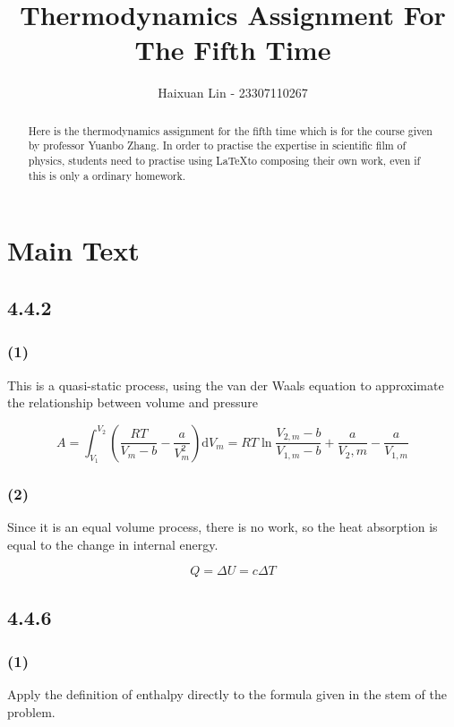 \documentclass[a4paper,11pt]{amsart}
\title{Thermodynamics Assignment For The Fifth Time}
\author{Haixuan Lin - 23307110267}
\theoremstyle{definition}
\begin{document}
	
	\begin{abstract}
		Here is the thermodynamics assignment for the fifth time which is for the course given by professor Yuanbo Zhang. In order to practise the expertise in scientific film of physics, students need to practise using \LaTeX to composing their own work, even if this is only a ordinary homework.
	\end{abstract}
	
	\maketitle
	\section*{Main Text}
	
	\subsection*{4.4.2}
	
	\subsubsection*{(1)}
	
	This is a quasi-static process, using the van der Waals equation to approximate the relationship between volume and pressure
	
	$$
	A=\int_{V_1}^{V_2}{\left( \frac{RT}{V_m-b}-\frac{a}{V_{m}^{2}} \right) \mathrm{d}V_m=RT\ln \frac{V_{2,m}-b}{V_{1,m}-b}+\frac{a}{V_2,m}}-\frac{a}{V_{1,m}}
	$$
	
	\subsubsection*{(2)}
	
	Since it is an equal volume process, there is no work, so the heat absorption is equal to the change in internal energy.
	
	$$
	Q=\Delta U=c\Delta T
	$$
	
	\subsection*{4.4.6}
	
	\subsubsection*{(1)}
	
	Apply the definition of enthalpy directly to the formula given in the stem of the problem.
	
\end{document}
